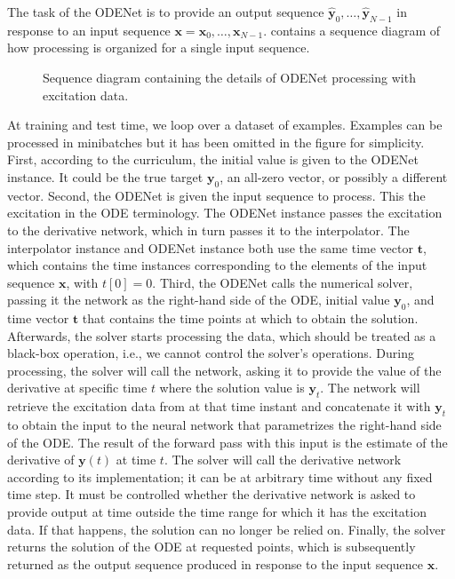 The task of the ODENet is to provide an output sequence $\hat{\pmb{y}}_0, \dots, \hat{\pmb{y}}_{N-1}$ in response to an input sequence $\pmb{x} = \pmb{x}_0, \dots, \pmb{x}_{N-1}$.  contains a sequence diagram of how processing is organized for a single input sequence.

\begin{figure}
  \centering
  \scalebox{0.9}{}
  \caption{Sequence diagram containing the details of ODENet processing with excitation data. }
  \label{fig:odenet_sequence_diagram}
\end{figure}

At training and test time, we loop over a dataset of examples. Examples can be processed in minibatches but it has been omitted in the figure for simplicity. First, according to the curriculum, the initial value is given to the ODENet instance. It could be the true target $\pmb{y}_0$, an all-zero vector, or possibly a different vector. Second, the ODENet is given the input sequence to process. This the excitation in the \ac{ODE} terminology. The ODENet instance passes the excitation to the derivative network, which in turn passes it to the interpolator. The interpolator instance and ODENet instance both use the same time vector $\pmb{t}$, which contains the time instances corresponding to the elements of the input sequence $\pmb{x}$, with $t[0]=0$. Third, the ODENet calls the numerical solver, passing it the network as the right-hand side of the \ac{ODE}, initial value $\pmb{y}_0$, and time vector $\pmb{t}$ that contains the time points at which to obtain the solution. Afterwards, the solver starts processing the data, which should be treated as a black-box operation, i.e., we cannot control the solver's operations. During processing, the solver will call the network, asking it to provide the value of the derivative at specific time $t$ where the solution value is $\pmb{y}_t$. The network will retrieve the excitation data from at that time instant and concatenate it with $\pmb{y}_t$ to obtain the input to the neural network that parametrizes the right-hand side of the \ac{ODE}. The result of the forward pass with this input is the estimate of the derivative of $\pmb{y}(t)$ at time $t$. The solver will call the derivative network according to its implementation; it can be at arbitrary time without any fixed time step. It must be controlled whether the derivative network is asked to provide output at time outside the time range for which it has the excitation data. If that happens, the solution can no longer be relied on. Finally, the solver returns the solution of the \ac{ODE} at requested points, which is subsequently returned as the output sequence produced in response to the input sequence $\pmb{x}$.

